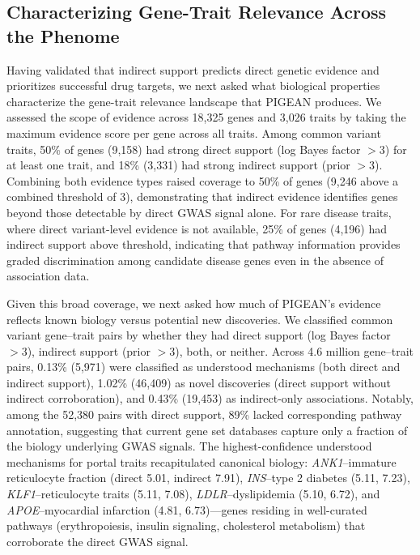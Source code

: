 \subsection{Characterizing Gene-Trait Relevance Across the Phenome}


Having validated that indirect support predicts direct genetic evidence and prioritizes successful drug targets, we next asked what biological properties characterize the gene-trait relevance landscape that PIGEAN produces. We assessed the scope of evidence across 18,325 genes and 3,026 traits by taking the maximum evidence score per gene across all traits. Among common variant traits, 50\% of genes (9,158) had strong direct support (log Bayes factor $> 3$) for at least one trait, and 18\% (3,331) had strong indirect support (prior $> 3$). Combining both evidence types raised coverage to 50\% of genes (9,246 above a combined threshold of 3), demonstrating that indirect evidence identifies genes beyond those detectable by direct GWAS signal alone. For rare disease traits, where direct variant-level evidence is not available, 25\% of genes (4,196) had indirect support above threshold, indicating that pathway information provides graded discrimination among candidate disease genes even in the absence of association data.

Given this broad coverage, we next asked how much of PIGEAN's evidence reflects known biology versus potential new discoveries. We classified common variant gene--trait pairs by whether they had direct support (log Bayes factor $> 3$), indirect support (prior $> 3$), both, or neither. Across 4.6 million gene--trait pairs, 0.13\% (5,971) were classified as understood mechanisms (both direct and indirect support), 1.02\% (46,409) as novel discoveries (direct support without indirect corroboration), and 0.43\% (19,453) as indirect-only associations. Notably, among the 52,380 pairs with direct support, 89\% lacked corresponding pathway annotation, suggesting that current gene set databases capture only a fraction of the biology underlying GWAS signals. The highest-confidence understood mechanisms for portal traits recapitulated canonical biology: \textit{ANK1}--immature reticulocyte fraction (direct 5.01, indirect 7.91), \textit{INS}--type 2 diabetes (5.11, 7.23), \textit{KLF1}--reticulocyte traits (5.11, 7.08), \textit{LDLR}--dyslipidemia (5.10, 6.72), and \textit{APOE}--myocardial infarction (4.81, 6.73)---genes residing in well-curated pathways (erythropoiesis, insulin signaling, cholesterol metabolism) that corroborate the direct GWAS signal.

